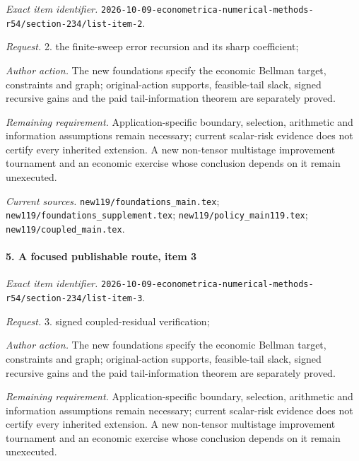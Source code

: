 \emph{Exact item identifier.} \nolinkurl{2026-10-09-econometrica-numerical-methods-r54/section-234/list-item-2}.

\par\emph{Request.} 2. the finite-sweep error recursion and its sharp coefficient;

\par\emph{Author action.} The new foundations specify the economic Bellman target, constraints and graph; original-action supports, feasible-tail slack, signed recursive gains and the paid tail-information theorem are separately proved.

\par\emph{Remaining requirement.} Application-specific boundary, selection, arithmetic and information assumptions remain necessary; current scalar-risk evidence does not certify every inherited extension. A new non-tensor multistage improvement tournament and an economic exercise whose conclusion depends on it remain unexecuted.

\par\emph{Current sources.} \nolinkurl{new119/foundations_main.tex}; \nolinkurl{new119/foundations_supplement.tex}; \nolinkurl{new119/policy_main119.tex}; \nolinkurl{new119/coupled_main.tex}.

\paragraph{5. A focused publishable route, item 3}

\emph{Exact item identifier.} \nolinkurl{2026-10-09-econometrica-numerical-methods-r54/section-234/list-item-3}.

\par\emph{Request.} 3. signed coupled-residual verification;

\par\emph{Author action.} The new foundations specify the economic Bellman target, constraints and graph; original-action supports, feasible-tail slack, signed recursive gains and the paid tail-information theorem are separately proved.

\par\emph{Remaining requirement.} Application-specific boundary, selection, arithmetic and information assumptions remain necessary; current scalar-risk evidence does not certify every inherited extension. A new non-tensor multistage improvement tournament and an economic exercise whose conclusion depends on it remain unexecuted.

